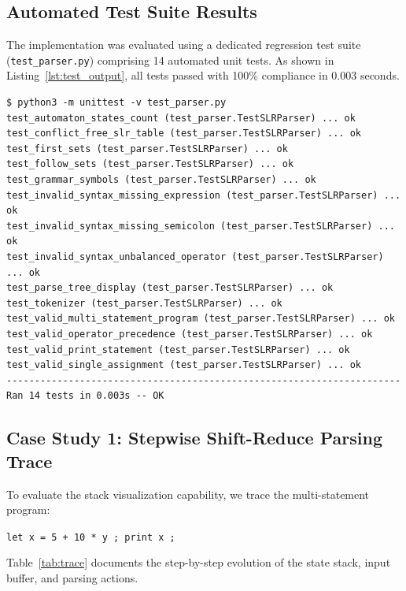 \documentclass[11pt,a4paper]{article}
\begin{document}
\subsection{Automated Test Suite Results}
The implementation was evaluated using a dedicated regression test suite (\texttt{test\_parser.py}) comprising 14 automated unit tests. As shown in Listing~\ref{lst:test_output}, all tests passed with 100\% compliance in 0.003 seconds.

\begin{lstlisting}[caption={Automated Unit Test Execution Output}, label={lst:test_output}]
$ python3 -m unittest -v test_parser.py
test_automaton_states_count (test_parser.TestSLRParser) ... ok
test_conflict_free_slr_table (test_parser.TestSLRParser) ... ok
test_first_sets (test_parser.TestSLRParser) ... ok
test_follow_sets (test_parser.TestSLRParser) ... ok
test_grammar_symbols (test_parser.TestSLRParser) ... ok
test_invalid_syntax_missing_expression (test_parser.TestSLRParser) ... ok
test_invalid_syntax_missing_semicolon (test_parser.TestSLRParser) ... ok
test_invalid_syntax_unbalanced_operator (test_parser.TestSLRParser) ... ok
test_parse_tree_display (test_parser.TestSLRParser) ... ok
test_tokenizer (test_parser.TestSLRParser) ... ok
test_valid_multi_statement_program (test_parser.TestSLRParser) ... ok
test_valid_operator_precedence (test_parser.TestSLRParser) ... ok
test_valid_print_statement (test_parser.TestSLRParser) ... ok
test_valid_single_assignment (test_parser.TestSLRParser) ... ok
----------------------------------------------------------------------
Ran 14 tests in 0.003s -- OK
\end{lstlisting}

\subsection{Case Study 1: Stepwise Shift-Reduce Parsing Trace}
To evaluate the stack visualization capability, we trace the multi-statement program:
\begin{center}
\texttt{let x = 5 + 10 * y ; print x ;}
\end{center}
Table~\ref{tab:trace} documents the step-by-step evolution of the state stack, input buffer, and parsing actions.
\end{document}
